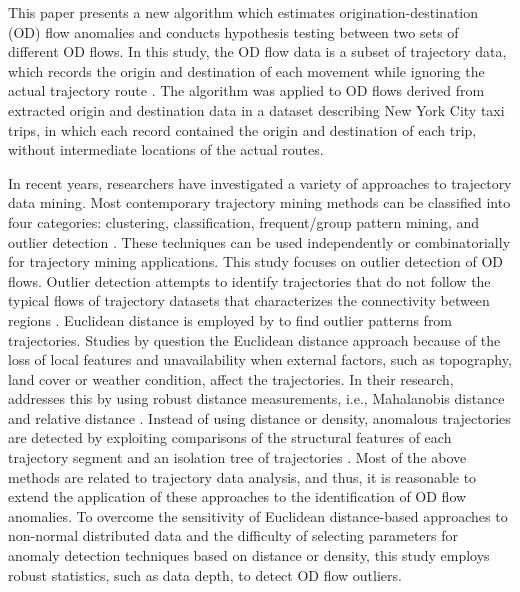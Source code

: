\documentclass[a4paper,UKenglish]{lipics-v2018}
\begin{document}
This paper presents a new algorithm which estimates origination-destination (OD) flow anomalies and conducts hypothesis testing between two sets of different OD flows. In this study, the OD flow data is a subset of trajectory data, which records the origin and destination of each movement while ignoring the actual trajectory route \cite{guo14IEEETVCG}.
The algorithm was applied to OD flows derived from extracted origin and destination data in a dataset describing New York City taxi trips, in which each record contained the origin and destination of each trip, without intermediate locations of the actual routes.


In recent years, researchers have investigated a variety of approaches to trajectory data mining.
Most contemporary trajectory mining methods can be classified into four categories: clustering, classification, frequent/group pattern mining, and outlier detection \cite{mazimpaka16JOSIS,zheng15ACMTIST}.
These techniques can be used independently or combinatorially for trajectory mining applications.
This study focuses on outlier detection of OD flows. Outlier detection attempts to identify trajectories that do not follow the typical flows of trajectory datasets that characterizes the connectivity between regions \cite{mazimpaka16JOSIS}. Euclidean distance is employed by \cite{fontes13GeoInfo,lee08ICDE} to find outlier patterns from trajectories. Studies by \cite{pan13ACMGIS,liu12IJGIS} question the Euclidean distance approach because of the loss of local features and unavailability when external factors, such as topography, land cover or weather condition, affect the trajectories. In their research, \cite{pan13ACMGIS,liu12IJGIS} addresses this by using robust distance measurements, i.e., Mahalanobis distance \cite{pan13ACMGIS} and relative distance \cite{liu12IJGIS}. Instead of using distance or density, anomalous trajectories are detected by exploiting comparisons of the structural features of each trajectory segment \cite{yuan11JCIS} and an isolation tree of trajectories \cite{zhang11UC}.
Most of the above methods are related to trajectory data analysis, and thus, it is reasonable to extend the application of these approaches to the identification of OD flow anomalies. 
To overcome the sensitivity of Euclidean distance-based approaches to non-normal distributed data and the difficulty of selecting parameters for anomaly detection techniques based on distance or density, this study employs robust statistics, such as data depth, to detect OD flow outliers.

\end{document}
